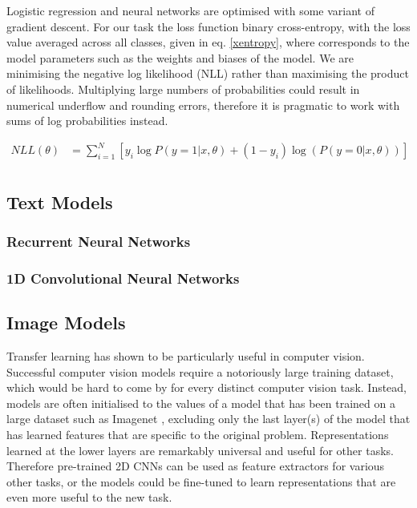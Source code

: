 Logistic regression and neural networks are optimised with some variant of gradient descent.
For our task the loss function binary cross-entropy, with the loss value averaged across all classes, given in eq. \ref{xentropy}, where \theta corresponds to the model parameters such as the weights and biases of the model.
We are minimising the negative log likelihood (NLL) rather than maximising the product of likelihoods.
Multiplying large numbers of probabilities could result in numerical underflow and rounding errors, therefore it is pragmatic to work with sums of log probabilities instead.

\begin{align}
  \label{xentropy}
  NLL(\theta) &= \sum\limits_{i=1}^N\left[y_i\log P(y=1|x, \theta) + (1-y_i)\log(P(y=0|x, \theta) )\right] \\
\end{align}



\subsection{Text Models}
\label{text_models}

\subsubsection{Recurrent Neural Networks}
\label{rnn}

\subsubsection{1D Convolutional Neural Networks}

\subsection{Image Models}
\label{image_models}

Transfer learning has shown to be particularly useful in computer vision.
Successful computer vision models require a notoriously large training dataset, which would be hard to come by for every distinct computer vision task.
Instead, models are often initialised to the values of a model that has been trained on a large dataset such as Imagenet \cite{}, excluding only the last layer(s) of the model that has learned features that are specific to the original problem.
Representations learned at the lower layers are remarkably  universal and useful for other tasks.
Therefore pre-trained 2D CNNs can be used as feature extractors for various other tasks,  or the models could be fine-tuned to learn representations that are even more useful to the new task.

